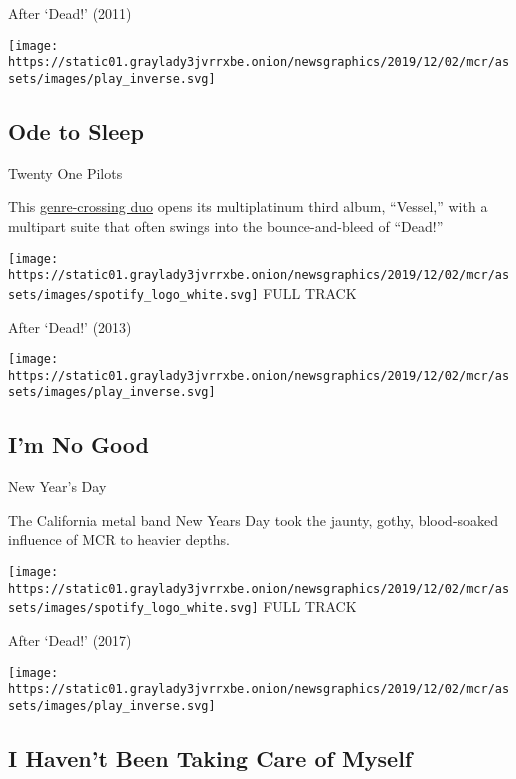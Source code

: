 After `Dead!' (2011)

\texttt{[image: https://static01.graylady3jvrrxbe.onion/newsgraphics/2019/12/02/mcr/assets/images/play\_inverse.svg]}

\hypertarget{ode-to-sleep}{%
\subsection{Ode to Sleep}\label{ode-to-sleep}}

Twenty One Pilots

This
\href{https://www.nytimes3xbfgragh.onion/2018/10/15/arts/music/twenty-one-pilots-trench.html}{genre-crossing
duo} opens its multiplatinum third album, ``Vessel,'' with a multipart
suite that often swings into the bounce-and-bleed of ``Dead!''

\href{https://open.spotify.com/track/773xZHHSHJvC1z3AAtWgH6?si=MfLb2-XUSVKiCQHJzX4lWw}{}

\texttt{[image: https://static01.graylady3jvrrxbe.onion/newsgraphics/2019/12/02/mcr/assets/images/spotify\_logo\_white.svg]}
FULL TRACK

After `Dead!' (2013)

\texttt{[image: https://static01.graylady3jvrrxbe.onion/newsgraphics/2019/12/02/mcr/assets/images/play\_inverse.svg]}

\hypertarget{im-no-good}{%
\subsection{I'm No Good}\label{im-no-good}}

New Year's Day

The California metal band New Years Day took the jaunty, gothy,
blood-soaked influence of MCR to heavier depths.

\href{https://open.spotify.com/track/4fbadwRBh2fy0EIoCPZyPA?si=sr6nkwghTAav8O0p7Kg3_w}{}

\texttt{[image: https://static01.graylady3jvrrxbe.onion/newsgraphics/2019/12/02/mcr/assets/images/spotify\_logo\_white.svg]}
FULL TRACK

After `Dead!' (2017)

\texttt{[image: https://static01.graylady3jvrrxbe.onion/newsgraphics/2019/12/02/mcr/assets/images/play\_inverse.svg]}

\hypertarget{i-havent-been-taking-care-of-myself}{%
\subsection{I Haven't Been Taking Care of
Myself}\label{i-havent-been-taking-care-of-myself}}

